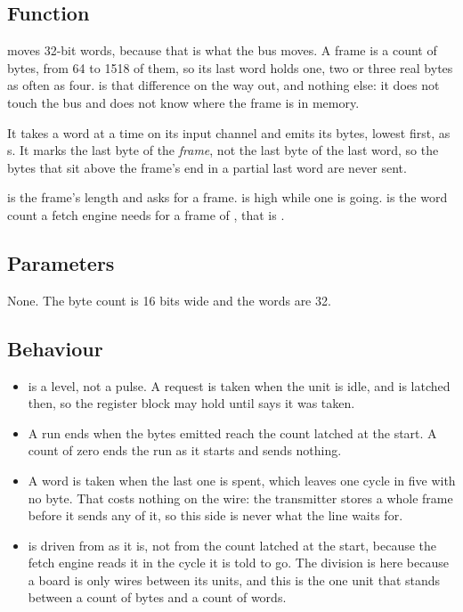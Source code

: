 
%
{}

\subsection*{Function}

 moves 32-bit words, because that is what the bus
moves. A frame is a count of bytes, from 64 to 1518 of them, so its
last word holds one, two or three real bytes as often as four.
 is that difference on the way out, and nothing else:
it does not touch the bus and does not know where the frame is in
memory.

It takes a word at a time on its input channel and emits its bytes,
lowest first, as s. It marks the last byte of the
\emph{frame}, not the last byte of the last word, so the bytes that
sit above the frame's end in a partial last word are never sent.

 is the frame's length and  asks for a frame.
 is high while one is going.  is the word
count a fetch engine needs for a frame of , that is
.

\subsection*{Parameters}

None. The byte count is 16 bits wide and the words are 32.


\subsection*{Behaviour}

\begin{itemize}
\item {} is a level, not a pulse. A request is taken when the
unit is idle, and  is latched then, so the register block
may hold  until  says it was taken.
\item A run ends when the bytes emitted reach the count latched at
the start. A count of zero ends the run as it starts and sends
nothing.
\item A word is taken when the last one is spent, which leaves one
cycle in five with no byte. That costs nothing on the wire: the
transmitter stores a whole frame before it sends any of it, so this
side is never what the line waits for.
\item {} is driven from  as it is, not from the
count latched at the start, because the fetch engine reads it in the
cycle it is told to go. The division is here because a board is only
wires between its units, and this is the one unit that stands between
a count of bytes and a count of words.
\end{itemize}

